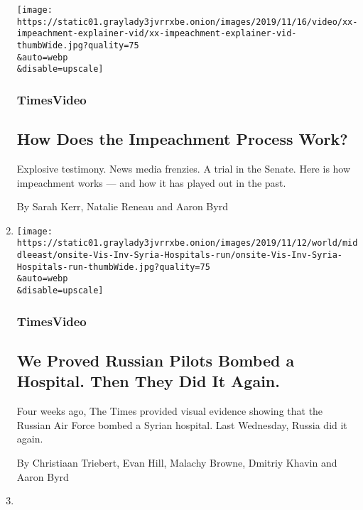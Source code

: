\begin{enumerate}
  \texttt{[image: https://static01.graylady3jvrrxbe.onion/images/2019/11/16/video/xx-impeachment-explainer-vid/xx-impeachment-explainer-vid-thumbWide.jpg?quality=75\\\&auto=webp\\\&disable=upscale]}

  \hypertarget{timesvideo-3}{%
  \subsubsection{TimesVideo}\label{timesvideo-3}}

  \hypertarget{how-does-the-impeachment-process-work}{%
  \subsection{How Does the Impeachment Process
  Work?}\label{how-does-the-impeachment-process-work}}

  Explosive testimony. News media frenzies. A trial in the Senate. Here
  is how impeachment works --- and how it has played out in the past.

  By Sarah Kerr, Natalie Reneau and Aaron Byrd
\item
  \href{/video/world/middleeast/100000006815692/syria-hospitals-russia.html}{}

  \texttt{[image: https://static01.graylady3jvrrxbe.onion/images/2019/11/12/world/middleeast/onsite-Vis-Inv-Syria-Hospitals-run/onsite-Vis-Inv-Syria-Hospitals-run-thumbWide.jpg?quality=75\\\&auto=webp\\\&disable=upscale]}

  \hypertarget{timesvideo-4}{%
  \subsubsection{TimesVideo}\label{timesvideo-4}}

  \hypertarget{we-proved-russian-pilots-bombed-a-hospital-then-they-did-it-again}{%
  \subsection{We Proved Russian Pilots Bombed a Hospital. Then They Did
  It
  Again.}\label{we-proved-russian-pilots-bombed-a-hospital-then-they-did-it-again}}

  Four weeks ago, The Times provided visual evidence showing that the
  Russian Air Force bombed a Syrian hospital. Last Wednesday, Russia did
  it again.

  By Christiaan Triebert, Evan Hill, Malachy Browne, Dmitriy Khavin and
  Aaron Byrd
\item
  \href{/2019/07/12/arts/bob-ross-paintings-mystery.html}{}


\end{enumerate}
